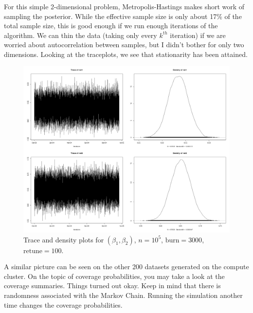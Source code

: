\documentclass[12pt]{article}
\begin{document}
For this simple 2-dimensional problem, Metropolis-Hastings makes short work of sampling the posterior. While the effective sample size is only about 17\% of the total sample size, this is good enough if we run enough iterations of the algorithm. We can thin the data (taking only every $k^{th}$ iteration) if we are worried about autocorrelation between samples, but I didn't bother for only two dimensions. Looking at the traceplots, we see that stationarity has been attained. 
\begin{figure}[H] \center
\includegraphics[scale=.20]{MCMC_p2.jpeg}
\caption*{Trace and density plots for $(\beta_1, \beta_2)$, $n=10^5$, $\text{burn}=3000$, $\text{retune}=100$.}
\end{figure}
A similar picture can be seen on the other 200 datasets generated on the compute cluster. On the topic of coverage probabilities, you may take a look at the coverage summaries. Things turned out okay. Keep in mind that there is randomness associated with the Markov Chain. Running the simulation another time changes the coverage probabilities.
\end{document}
